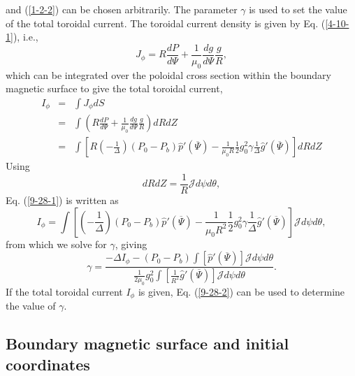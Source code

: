 \documentclass{llncs}
\begin{document}
and (\ref{1-2-2}) can be chosen arbitrarily. The parameter $\gamma$ is used to
set the value of the total toroidal current. The toroidal current density is
given by Eq. (\ref{4-10-1}), i.e.,
\begin{equation}
  J_{\phi} = R \frac{d P}{d \Psi} + \frac{1}{\mu_0} \frac{d g}{d \Psi}
  \frac{g}{R},
\end{equation}
which can be integrated over the poloidal cross section within the boundary
magnetic surface to give the total toroidal current,
\begin{eqnarray}
  I_{\phi} & = & \int J_{\phi} d S \nonumber\\
  & = & \int \left( R \frac{d P}{d \Psi} + \frac{1}{\mu_0} \frac{d g}{d \Psi}
  \frac{g}{R} \right) d R d Z \nonumber\\
  & = & \int \left[ R \left( - \frac{1}{\Delta} \right) (P_0 - P_b) \hat{p}'
  (\overline{\Psi}) - \frac{1}{\mu_0 R}  \frac{1}{2} g_0^2 \gamma
  \frac{1}{\Delta} \hat{g}' (\overline{\Psi}) \right] d R d Z  \label{9-28-1}
\end{eqnarray}
Using
\begin{equation}
  d R d Z = \frac{1}{R} \mathcal{J}d \psi d \theta,
\end{equation}
Eq. (\ref{9-28-1}) is written as
\begin{equation}
  I_{\phi} = \int \left[ \left( - \frac{1}{\Delta} \right) (P_0 - P_b)
  \hat{p}' (\overline{\Psi}) - \frac{1}{\mu_0 R^2} \frac{1}{2} g_0^2 \gamma
  \frac{1}{\Delta} \hat{g}' (\overline{\Psi}) \right] \mathcal{J}d \psi d
  \theta,
\end{equation}
from which we solve for $\gamma$, giving
\begin{equation}
  \label{9-28-2} \gamma = \frac{- \Delta I_{\phi} - (P_0 - P_b) \int [\hat{p}'
  (\overline{\Psi})] \mathcal{J}d \psi d \theta}{\frac{1}{2 \mu_0} g_0^2 \int
  \left[ \frac{1}{R^2} \hat{g}' (\overline{\Psi}) \right] \mathcal{J}d \psi d
  \theta} .
\end{equation}
If the total toroidal current $I_{\phi}$ is given, Eq. (\ref{9-28-2}) can be
used to determine the value of $\gamma$.

\subsection{Boundary magnetic surface and initial coordinates}
\end{document}
